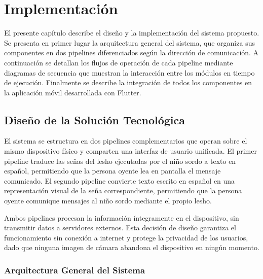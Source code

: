\usetikzlibrary{arrows.meta, calc, fit, backgrounds, positioning}

\chapter[Implementación]{Implementación}
\label{ch:implementacion}

\insertminitoc
\parindent0pt

El presente capítulo describe el diseño y la implementación del sistema propuesto. Se
presenta en primer lugar la arquitectura general del sistema, que organiza sus
componentes en dos pipelines diferenciados según la dirección de comunicación. A
continuación se detallan los flujos de operación de cada pipeline mediante diagramas
de secuencia que muestran la interacción entre los módulos en tiempo de ejecución.
Finalmente se describe la integración de todos los componentes en la aplicación móvil
desarrollada con Flutter.

\section{Diseño de la Solución Tecnológica}

El sistema se estructura en dos pipelines complementarios que operan sobre el mismo
dispositivo físico y comparten una interfaz de usuario unificada. El primer pipeline
traduce las señas del \acrshort{lesho} ejecutadas por el niño sordo a texto en español,
permitiendo que la persona oyente lea en pantalla el mensaje comunicado. El segundo
pipeline convierte texto escrito en español en una representación visual de la seña
correspondiente, permitiendo que la persona oyente comunique mensajes al niño sordo
mediante el propio \acrshort{lesho}.

Ambos pipelines procesan la información íntegramente en el dispositivo, sin transmitir
datos a servidores externos. Esta decisión de diseño garantiza el funcionamiento sin
conexión a internet y protege la privacidad de los usuarios, dado que ninguna imagen
de cámara abandona el dispositivo en ningún momento.

\subsection{Arquitectura General del Sistema}

